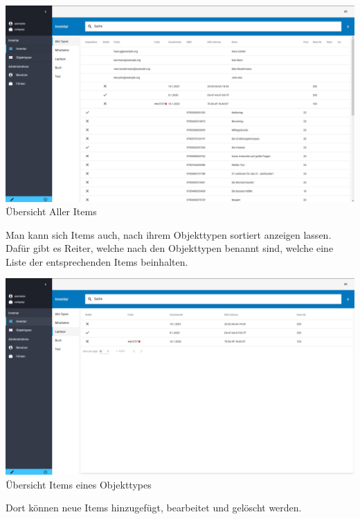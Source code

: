 \documentclass[11pt,a4paper]{report}
\begin{document}
	\begin{center}
		\includegraphics[scale=0.3]{Globale-Itemansicht.png}\\
		Übersicht Aller Items\\
	\end{center}
	
	Man kann sich Items auch, nach ihrem Objekttypen sortiert anzeigen lassen.
	Dafür gibt es Reiter, welche nach den Objekttypen benannt sind, welche eine Liste der entsprechenden Items beinhalten.\\

	\begin{center}
		\includegraphics[scale=0.3]{Itemansicht.png}\\
		Übersicht Items eines Objekttypes\\
	\end{center}
	
	Dort können neue Items hinzugefügt, bearbeitet und gelöscht werden.\\
	
\end{document}
